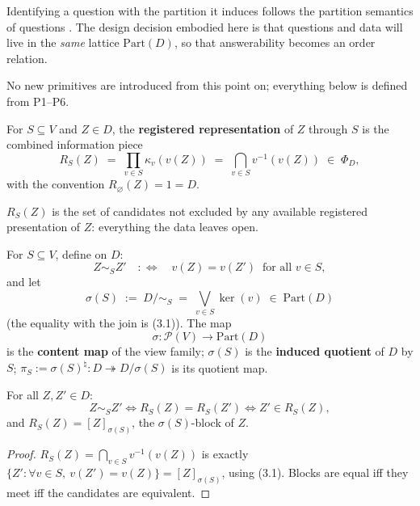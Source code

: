 Identifying a question with the partition it induces follows the partition semantics of questions \autocite{hamblin1958,groenendijk1984}. The design decision embodied here is that questions and data will live in the \emph{same} lattice \(\mathrm{Part}(D)\), so that answerability becomes an order relation.


No new primitives are introduced from this point on; everything below is defined from P1--P6.

\begin{thmdef}

For \(S \subseteq V\) and \(Z \in D\), the \textbf{registered representation} of \(Z\) through \(S\) is the combined information piece
\[
R_S(Z) \;=\; \prod_{v \in S} \kappa_v(v(Z)) \;=\; \bigcap_{v \in S} v^{-1}(v(Z)) \;\in\; \Phi_D,
\]
with the convention \(R_\varnothing(Z) = 1 = D\).
\end{thmdef}

\(R_S(Z)\) is the set of candidates not excluded by any available registered presentation of \(Z\): everything the data leaves open.

\begin{thmdef}

For \(S \subseteq V\), define on \(D\):
\[
Z \sim_S Z' \quad :\iff \quad v(Z) = v(Z') \ \text{ for all } v \in S,
\]
and let
\[
\sigma(S) \;:=\; D/\!\sim_S \;=\; \bigvee_{v \in S} \ker(v) \;\in\; \mathrm{Part}(D)
\]
(the equality with the join is (3.1)). The map
\[
\sigma : \mathcal{P}(V) \to \mathrm{Part}(D)
\]
is the \textbf{content map} of the view family; \(\sigma(S)\) is the \textbf{induced quotient} of \(D\) by \(S\); \(\pi_S := \sigma(S)^\natural : D \twoheadrightarrow D/\sigma(S)\) is its quotient map.
\end{thmdef}

\begin{thmplain}

For all \(Z, Z' \in D\):
\[
Z \sim_S Z' \iff R_S(Z) = R_S(Z') \iff Z' \in R_S(Z),
\]
and \(R_S(Z) = [Z]_{\sigma(S)}\), the \(\sigma(S)\)-block of \(Z\).
\end{thmplain}

\begin{proof}

\(R_S(Z) = \bigcap_{v\in S} v^{-1}(v(Z))\) is exactly \(\{Z' : \forall v \in S,\ v(Z') = v(Z)\} = [Z]_{\sigma(S)}\), using (3.1). Blocks are equal iff they meet iff the candidates are equivalent.
\end{proof}

